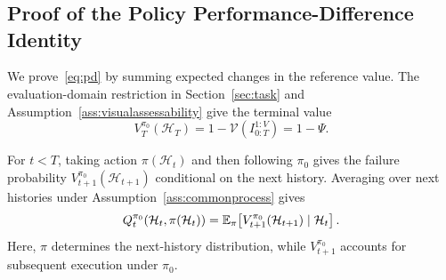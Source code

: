 
\section{}
\label{app:actionproofs}
\subsection{Proof of the Policy Performance-Difference Identity}
\label{app:pdidentity}
We prove~\eqref{eq:pd} by summing expected changes in the reference value.
The evaluation-domain restriction in Section~\ref{sec:task} and
Assumption~\ref{ass:visualassessability} give the terminal value
\begin{equation}
 V_T^{\pi_0}(\mathcal H_T)
 =1-\mathcal V(I_{0:T}^{1:V})=1-\Psi.
 \label{eq:appterminalvalue}
\end{equation}

For $t<T$, taking action $\pi(\mathcal H_t)$ and then following $\pi_0$
gives the failure probability $V_{t+1}^{\pi_0}(\mathcal H_{t+1})$ conditional on the next history.
Averaging over next histories under Assumption~\ref{ass:commonprocess} gives
\begin{equation}
 Q_t^{\pi_0}(\mathcal H_t,\pi(\mathcal H_t))
 =
 \mathbb E_\pi\!\left[
 V_{t+1}^{\pi_0}(\mathcal H_{t+1})
 \mid \mathcal H_t
 \right].
 \label{eq:appvaluerecursion}
\end{equation}
Here, $\pi$ determines the next-history distribution, while $V_{t+1}^{\pi_0}$
accounts for subsequent execution under $\pi_0$.

